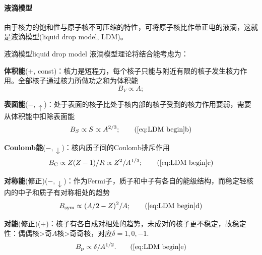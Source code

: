 \paragraph{液滴模型}

由于核力的饱和性与原子核不可压缩的特性，可将原子核比作带正电的液滴，这就是液滴模型(liquid drop model, LDM)。

\begin{theorem}{液滴模型}{liquid drop model}
	液滴模型理论将结合能考虑为：
	\begin{compactenum}
		\item\textbf{体积能}($+$, const)：核力是短程力，每个核子只能与附近有限的核子发生核力作用。全部核子通过核力所做功之和为体积能
		\begin{subequations}
			\label{eq:LDM begin}
			\begin{equation}
				\label{eq:LDM volume energy}
				B_V\propto A;
			\end{equation}
		\end{subequations}
		\item\textbf{表面能}($-,\uparrow$)：处于表面的核子比处于核内部的核子受到的核力作用要弱，需要从体积能中扣除表面能
		\begin{equation}
			\label{eq:LDM surface energy}
			B_S\propto S\propto A^{2/3};
			\tag{\ref{eq:LDM begin}b}
		\end{equation}
		\item\textbf{Coulomb能}($-,\downarrow$)：核内质子间的Coulomb排斥作用
		\begin{equation}
			\label{eq:LDM Coulomb energy}
			B_\mathrm C\propto Z(Z-1)/R\propto Z^2/A^{1/3};
			\tag{\ref{eq:LDM begin}c}
		\end{equation}
		\item\textbf{对称能}(修正)($-,\downarrow$)：作为Fermi子，质子和中子有各自的能级结构，而稳定轻核内的中子和质子有对称相处的趋势
		\begin{equation}
			\label{eq:LDM symmetry energy}
			B_\mathrm{sym}\propto(A/2-Z)^2/A;
			\tag{\ref{eq:LDM begin}d}
		\end{equation}
		\item\textbf{对能}(修正)($+$)：核子有各自成对相处的趋势，未成对的核子更不稳定，故稳定性：偶偶核>奇$A$核>奇奇核，对应$\delta=1,0,-1.$
		\begin{equation}
			\label{eq:LDM pairing energy}
			B_\mathrm p\propto\delta/A^{1/2}.
			\tag{\ref{eq:LDM begin}e}
		\end{equation}
	\end{compactenum}

\end{theorem}
